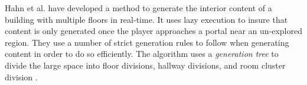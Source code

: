 Hahn et al. have developed a method to generate the interior content of a building with multiple floors in real-time. It uses lazy execution to insure that content is only generated once the player approaches a portal near an un-explored region. They use a number of strict generation rules to follow when generating content in order to do so efficiently. The algorithm uses a {\em generation tree} to divide the large space into floor divisions, hallway divisions, and room cluster division \citep{Hahn:2006:PRB:1183316.1183342}.